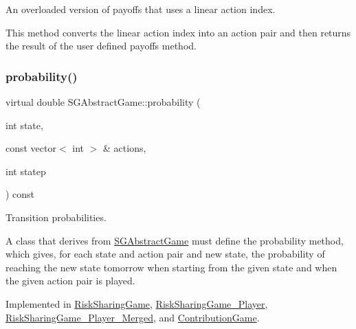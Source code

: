 An overloaded version of payoffs that uses a linear action index. 

This method converts the linear action index into an action pair and then returns the result of the user defined payoffs method. \mbox{\label{classSGAbstractGame_a416b31d5020b75de49447ce4f7783b98}} 
\subsubsection{\texorpdfstring{probability()}{probability()}\hspace{0.1cm}{\footnotesize\ttfamily [1/2]}}
{\footnotesize\ttfamily virtual double S\+G\+Abstract\+Game\+::probability (\begin{DoxyParamCaption}\item[{int}]{state,  }\item[{const vector$<$ int $>$ \&}]{actions,  }\item[{int}]{statep }\end{DoxyParamCaption}) const\hspace{0.3cm}{\ttfamily [pure virtual]}}



Transition probabilities. 

A class that derives from \hyperlink{classSGAbstractGame}{S\+G\+Abstract\+Game} must define the probability method, which gives, for each state and action pair and new state, the probability of reaching the new state tomorrow when starting from the given state and when the given action pair is played. 

Implemented in \hyperlink{classRiskSharingGame_aa9ae41ec3aec3342ffd2d16187746718}{Risk\+Sharing\+Game}, \hyperlink{classRiskSharingGame__3Player_a48f478394bae9cf7479519da9b18a987}{Risk\+Sharing\+Game\+\_\+Player}, \hyperlink{classRiskSharingGame__3Player__Merged_a505d06e31a1cabde1c6fab8ac5af8409}{Risk\+Sharing\+Game\+\_\+Player\+\_\+\+Merged}, and \hyperlink{classContributionGame_a7b5ca7f6f0119f5899784ceae570666d}{Contribution\+Game}.

\mbox{\label{classSGAbstractGame_a922ec5b744295bf7d367f4df20f65b9f}} 
